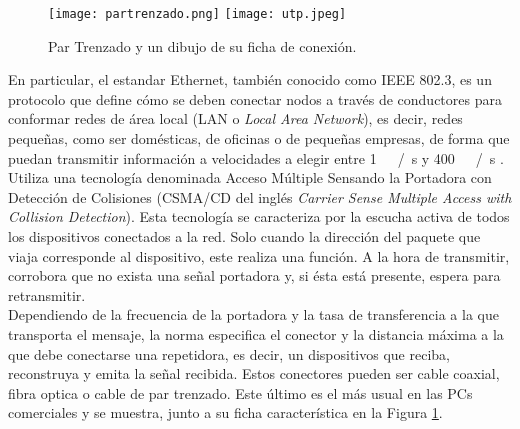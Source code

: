 \begin{figure}
	\centering
	\texttt{[image: partrenzado.png]}
	\texttt{[image: utp.jpeg]}
	\caption{Par Trenzado y un dibujo de su ficha de conexión.}
	\label{fig:utp}
\end{figure}

En particular, el estandar Ethernet, también conocido como IEEE 802.3, es un protocolo que define cómo se deben conectar nodos a través de conductores para conformar redes de área local (LAN o {\it Local Area Network}), es decir, redes pequeñas, como ser domésticas, de oficinas o de pequeñas empresas, de forma que puedan transmitir información a velocidades a elegir entre \SI{1}{\mega\bit\slash\second} y \SI{400}{\giga\bit\slash\second} \cite{Ethernet2018}. Utiliza una tecnología denominada Acceso Múltiple Sensando la Portadora con Detección de Colisiones (CSMA/CD del inglés {\it Carrier Sense Multiple Access with Collision Detection}). Esta tecnología se caracteriza por la escucha activa de todos los dispositivos conectados a la red. Solo cuando la dirección del paquete que viaja corresponde al dispositivo, este realiza una función. A la hora de transmitir, corrobora que no exista una señal portadora y, si ésta está presente, espera para retransmitir.\\

Dependiendo de la frecuencia de la portadora y la tasa de transferencia a la que transporta el mensaje, la norma especifica el conector y la distancia máxima a la que debe conectarse una repetidora, es decir, un dispositivos que reciba, reconstruya y emita la señal recibida. Estos conectores pueden ser cable coaxial, fibra optica o cable de par trenzado. Este último es el más usual en las PCs comerciales y se muestra, junto a su ficha característica en la Figura \ref{fig:utp}.\\

